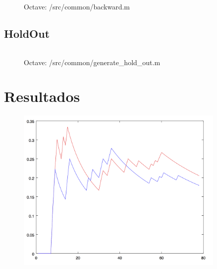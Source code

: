 \documentclass[10pt, a4paper,spanish]{article}
\begin{document}
			\paragraph{}

			\begin{figure}[htpb!]
				\centering
				\inputminted{octave}{../src/common/backward.m}
				\caption{Octave: /src/common/backward.m}
				\label{code:backward}
			\end{figure}


		\subsection{HoldOut}
			\paragraph{}


			\begin{figure}[htpb!]
				\centering
				\inputminted{octave}{../src/common/generate_hold_out.m}
				\caption{Octave: /src/common/generate\_hold\_out.m}
				\label{code:generate_hold_out}
			\end{figure}

	\section{Resultados}

		\begin{figure}[H]
			\begin{center}
				\includegraphics[width=0.9\textwidth]{chart}
			\end{center}
		\end{figure}
\end{document}
